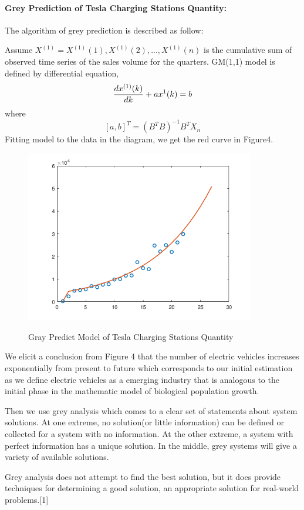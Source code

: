 \documentclass{mcmthesis}
\begin{document}
		\paragraph{Grey Prediction of Tesla Charging Stations Quantity:}
		The algorithm of grey prediction is described as follow:
		\par
		Assume $X^{(1)}={X^{(1)}(1),X^{(1)}(2),...,X^{(1)}(n)}$  is the cumulative sum of observed time series of the sales volume for the quarters.
		GM(1,1) model is defined by differential equation, $${{d{x^{(1)}}(k)} \over {dk}} + a{x^1}(k) = b$$ where $${[a,b]^T} = {({B^T}B)^{ - 1}}{B^T}{X_n}$$
		Fitting model to the data in the diagram, we get the red curve in Figure4.
		\begin{figure}[htbp]
			\centering
			\includegraphics[width=10cm]{img/greyPredict.png}\\
			\caption{Gray Predict Model of Tesla  Charging Stations Quantity}
			\label{Figure4}
		\end{figure}
				We elicit a conclusion from Figure 4 that the number of electric vehicles increases exponentially from present to future which corresponds to our initial estimation as we define electric vehicles as a emerging industry that is analogous to the initial phase in the mathematic model of biological population growth.
				\par
				Then we use grey analysis which comes to a clear set of statements about system solutions.
				 At one extreme, no solution(or little information) can be defined or collected for a system with no information. At the other extreme, a system with perfect information has a unique solution. In the middle, grey systems will give a variety of available solutions. 
				 \par
				 Grey analysis does not attempt to find the best solution, but it does provide techniques for determining a good solution, an appropriate solution for real-world problems.[1]
				 
\end{document}
